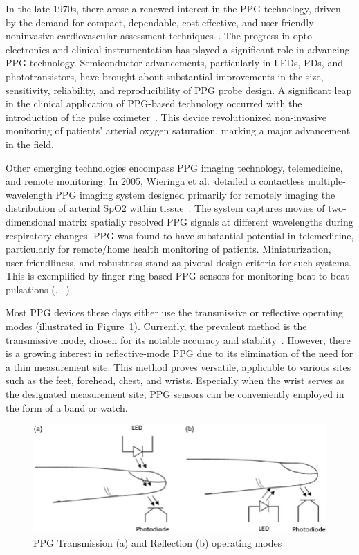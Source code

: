 In the late 1970s, there arose a renewed interest in the PPG technology, driven by the demand for compact, dependable, cost-effective, and user-friendly noninvasive cardiovascular assessment techniques~\cite{yoshiyaSpectrophotometricMonitoringArterial1980}.
The progress in opto-electronics and clinical instrumentation has played a significant role in advancing PPG technology.
Semiconductor advancements, particularly in LEDs, PDs, and phototransistors, have brought about substantial improvements in the size, sensitivity, reliability, and reproducibility of PPG probe design.
A significant leap in the clinical application of PPG-based technology occurred with the introduction of the pulse oximeter~\cite{aoyagiPulseOximetryIts2002}.
This device revolutionized non-invasive monitoring of patients' arterial oxygen saturation, marking a major advancement in the field.

Other emerging technologies encompass PPG imaging technology, telemedicine, and remote monitoring.
In 2005, Wieringa et al.\ detailed a contactless multiple-wavelength PPG imaging system designed primarily for remotely imaging the distribution of arterial SpO2 within tissue~\cite{wieringaContactlessMultipleWavelength2005b}.
The system captures movies of two-dimensional matrix spatially resolved PPG signals at different wavelengths during respiratory changes.
PPG was found to have substantial potential in telemedicine, particularly for remote/home health monitoring of patients.
Miniaturization, user-friendliness, and robustness stand as pivotal design criteria for such systems.
This is exemplified by finger ring-based PPG sensors for monitoring beat-to-beat pulsations (\cite{rheeArtifactresistantPowerefficientDesign2001}, ~\cite{zhengRingtypeDeviceNoninvasive2003}).

Most PPG devices these days either use the transmissive or reflective operating modes (illustrated in Figure~\ref{fig:reflection}).
Currently, the prevalent method is the transmissive mode, chosen for its notable accuracy and stability~\cite{leeReflectancePulseOximetry2016}.
However, there is a growing interest in reflective-mode PPG due to its elimination of the need for a thin measurement site.
This method proves versatile, applicable to various sites such as the feet, forehead, chest, and wrists.
Especially when the wrist serves as the designated measurement site, PPG sensors can be conveniently employed in the form of a band or watch.

\begin{figure}[h]
    \centering
    \includegraphics[scale=0.4]{images/ppg/reflection}
    \caption{PPG Transmission (a) and Reflection (b) operating modes \cite{mohanSpotMeasurementHeart2016}}
    \label{fig:reflection}
\end{figure}

